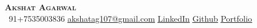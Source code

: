 \begin{center}
    \textbf{\Huge \scshape Akshat Agarwal} \\ \vspace{1pt}
     \ \small 91+7535003836 \quad
    \href{mailto:akshatag107@gmail.com}{ \underline{akshatag107@gmail.com}} \quad
    \href{https://www.linkedin.com/in/akshat-agarwal-02a863236/}{ \underline{LinkedIn}} \quad
    \href{https://github.com/Akshat-sGit}{ \underline{Github}} \quad
    \href{https://akshat-sgit.github.io/web_portfolio/}{ \underline{Portfolio}} \quad
    
    
\end{center}